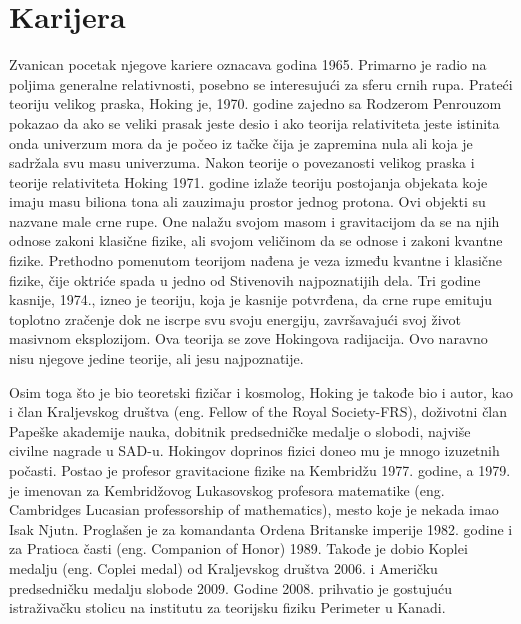 \documentclass[a4paper, 12pt]{article}
\begin{document}
{\section{Karijera}
Zvanican pocetak njegove kariere oznacava godina 1965. Primarno je radio na poljima generalne 
relativnosti, posebno se interesujući za sferu crnih rupa. Prateći teoriju velikog 
praska, Hoking je, 1970. godine zajedno sa Rodzerom Penrouzom pokazao da ako se veliki 
prasak jeste desio i ako teorija relativiteta jeste istinita onda univerzum mora da je 
počeo iz tačke čija je zapremina nula ali koja je sadržala svu masu univerzuma. \cite{famousscientists}
Nakon teorije o povezanosti velikog praska i teorije relativiteta Hoking 
1971. godine izlaže teoriju postojanja objekata koje imaju masu biliona 
tona ali zauzimaju prostor jednog protona. Ovi objekti su nazvane male crne rupe. 
One nalažu svojom masom i gravitacijom da se na njih odnose zakoni klasične fizike, 
ali svojom veličinom da se odnose i zakoni kvantne fizike. Prethodno pomenutom teorijom nađena je 
veza između kvantne i klasične fizike, čije oktriće spada u jedno od Stivenovih 
najpoznatijih dela. Tri godine kasnije, 1974., izneo je teoriju, koja je kasnije 
potvrđena, da crne rupe emituju toplotno zračenje dok ne iscrpe svu svoju energiju, 
završavajući svoj život masivnom eksplozijom. Ova teorija se zove Hokingova radijacija. 
Ovo naravno nisu njegove jedine teorije, ali jesu najpoznatije. \midskip \cite{britishphysicists}

Osim toga što je bio teoretski fizičar i kosmolog, Hoking je takođe bio i autor, 
kao i član Kraljevskog društva (eng. Fellow of the Royal Society-FRS), doživotni član Papeške akademije nauka, dobitnik 
predsedničke medalje o slobodi, najviše civilne nagrade u SAD-u. Hokingov doprinos 
fizici doneo mu je mnogo izuzetnih počasti. Postao je profesor gravitacione fizike na 
Kembridžu 1977. godine, a 1979. je imenovan za Kembridžovog Lukasovskog profesora 
matematike (eng. Cambridges Lucasian professorship of mathematics), mesto koje je 
nekada imao Isak Njutn. Proglašen je za komandanta Ordena Britanske imperije 1982. 
godine i za Pratioca časti (eng. Companion of Honor) 1989. Takođe je dobio Koplei 
medalju (eng. Coplei medal) od Kraljevskog društva 2006. i Američku predsedničku 
medalju slobode 2009. Godine 2008. prihvatio je gostujuću istraživačku stolicu na 
institutu za teorijsku fiziku Perimeter u Kanadi. \cite{britishphysicists}

}
\end{document}
